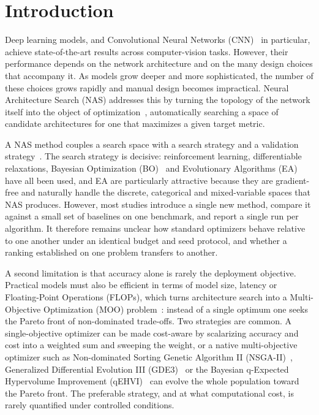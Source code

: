 \documentclass[runningheads]{llncs}
\begin{document}
%
%
\section{Introduction}\label{SEC1}
\noindent 
Deep learning models, and Convolutional Neural Networks (CNN)~\cite{lecun1998gradient} in particular, achieve state-of-the-art results across computer-vision tasks. However, their performance depends on the network architecture and on the many design choices that accompany it. As models grow deeper and more sophisticated, the number of these choices grows rapidly and manual design becomes impractical. Neural Architecture Search (NAS) addresses this by turning the topology of the network itself into the object of optimization~\cite{avval2025systematic}, automatically searching a space of candidate architectures for one that maximizes a given target metric.

A NAS method couples a search space with a search strategy and a validation strategy~\cite{avval2025systematic}. The search strategy is decisive: reinforcement learning, differentiable relaxations, Bayesian Optimization (BO)~\cite{snoek2012bo} and Evolutionary Algorithms (EA)~\cite{eiben2015ec} have all been used, and EA are particularly attractive because they are gradient-free and naturally handle the discrete, categorical and mixed-variable spaces that NAS produces. However, most studies introduce a single new method, compare it against a small set of baselines on one benchmark, and report a single run per algorithm. It therefore remains unclear how standard optimizers behave relative to one another under an identical budget and seed protocol, and whether a ranking established on one problem transfers to another.

A second limitation is that accuracy alone is rarely the deployment objective. Practical models must also be efficient in terms of model size, latency or Floating-Point Operations (FLOPs), which turns architecture search into a Multi-Objective Optimization (MOO) problem~\cite{zhao2024lamoo}: instead of a single optimum one seeks the Pareto front of non-dominated trade-offs. Two strategies are common. A single-objective optimizer can be made cost-aware by scalarizing accuracy and cost into a weighted sum and sweeping the weight, or a native multi-objective optimizer such as Non-dominated Sorting Genetic Algorithm II (NSGA-II)~\cite{deb2002nsga2}, Generalized Differential Evolution III (GDE3)~\cite{kukkonen2005gde3} or the Bayesian q-Expected Hypervolume Improvement (qEHVI)~\cite{daulton2020qehvi} can evolve the whole population toward the Pareto front. The preferable strategy, and at what computational cost, is rarely quantified under controlled conditions.
\end{document}
